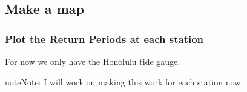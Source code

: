 \documentclass[letterpaper,10pt,english]{jupyterBook}
\begin{document}
\subsection{Make a map}
\label{\detokenize{notebooks/regional_and_local/SL_Extremes_annual:make-a-map}}

\subsubsection{Plot the Return Periods at each station}
\label{\detokenize{notebooks/regional_and_local/SL_Extremes_annual:plot-the-return-periods-at-each-station}}
\sphinxAtStartPar
For now we only have the Honolulu tide gauge.

\begin{sphinxadmonition}{note}{Note:}
\sphinxAtStartPar
I will work on making this work for each station now.
\end{sphinxadmonition}
\end{document}

